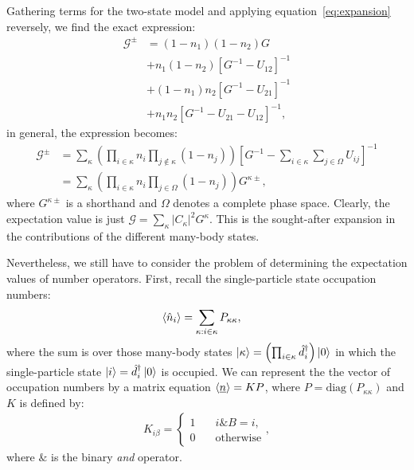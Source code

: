 \documentclass{article}
\begin{document}
\begin{multicols}{2}
        Gathering terms for the two-state model and applying equation~\ref{eq:expansion} reversely, we find the exact expression:
        \begin{align}\label{eq:mbgf2}
            \mathscr{G}^\pm &= (1-n_1)(1-n_2) G \\ &+ n_1 (1-n_2) \left[ G^{-1} - U_{12}\right]^{-1} \nonumber\\ &+ (1-n_1)n_2 \left[ G^{-1} - U_{21}\right]^{-1} \nonumber\\ &+ n_1 n_2\left[ G^{-1} - U_{21} - U_{12}\right]^{-1} \nonumber,
        \end{align}
        in general, the expression becomes:
        \begin{align}\label{eq:mbgf}
        \mathscr{G}^\pm &= \sum_\kappa \left(\prod_{i\in\kappa} n_i \prod_{j\notin \kappa} (1-n_j) \right) \left[G^{-1} - \sum_{i\in\kappa} \sum_{j\in\Omega} U_{ij}\right]^{-1} \\
        \nonumber &= \sum_\kappa \left(\prod_{i\in\kappa} n_i \prod_{j\in\Omega} (1-n_j) \right) G^{\kappa\pm},
        \end{align}
        where $G^{\kappa\pm}$ is a shorthand and $\Omega$ denotes a complete phase space. Clearly, the expectation value is just $\mathscr{G} = \sum_\kappa \left|C_\kappa\right|^2 G^{\kappa}$. This is the sought-after expansion in the contributions of the different many-body states.
                  
        Nevertheless, we still have to consider the problem of determining the expectation values of number operators. First, recall the single-particle state occupation numbers:
        \begin{align*}
            \braket{\hat{n}_i} &= \sum_{\kappa: i\in \kappa} P_{\kappa\kappa},
        \end{align*}
        where the sum is over those many-body states $\ket{\kappa}=\left(\prod_{i\in\kappa}\hat{d}_i^\dagger \right)\ket{0}$ in which the single-particle state $\ket{i} = \hat{d}_i^\dagger \ket{0}$ is occupied. We can represent the the vector of occupation numbers by a matrix equation $\braket{\underline{n}} = KP$, where $P=\text{diag}(P_{\kappa\kappa})$ and $K$ is defined by:
        \begin{align}
            K_{i\beta} = \begin{cases} 1 & \quad i\&B=i, \\ 0 & \quad\text{otherwise}\end{cases},
        \label{eq:kmatrix}\end{align}
        where $\&$ is the binary \emph{and} operator.
        

\end{multicols}
\end{document}
